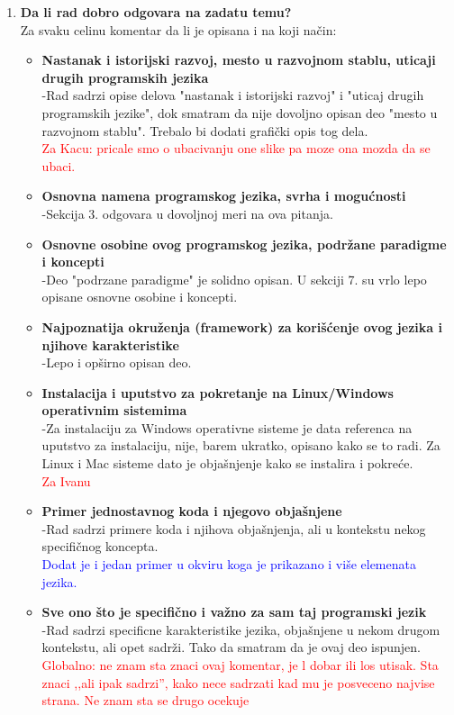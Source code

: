 \documentclass[a4paper]{report}
\newcommand{\odgovorAutora}[1]{\textcolor{blue}{#1}}
\newcommand{\note}[1]{\textcolor{red}{#1}}
\begin{document}
\begin{enumerate}
\item \textbf {Da li rad dobro odgovara na zadatu temu?}\\
  Za svaku celinu komentar da li je opisana i na koji na\v cin:
\begin{itemize}
   

    \item \textbf {Nastanak i istorijski razvoj, mesto u razvojnom stablu, uticaji drugih programskih jezika} \\
      -Rad sadrzi opise delova "nastanak i istorijski razvoj" i "uticaj drugih programskih jezike", dok smatram da nije dovoljno opisan deo "mesto u razvojnom stablu". Trebalo bi dodati grafi\v cki opis tog dela. \\
\note{Za Kacu: pricale smo o ubacivanju one slike pa moze ona mozda da se ubaci.}

    \item \textbf {Osnovna namena programskog jezika, svrha i mogućnosti}\\
      -Sekcija 3. odgovara u dovoljnoj meri na ova pitanja.
    \item \textbf {Osnovne osobine ovog programskog jezika, podržane paradigme i koncepti}\\
      -Deo "podrzane paradigme" je solidno opisan. U sekciji 7. su vrlo lepo opisane osnovne osobine i koncepti.
    \item \textbf {Najpoznatija okruženja (framework) za korišćenje ovog jezika i njihove karakteristike}\\
      -Lepo i op\v sirno opisan deo.
    \item \textbf {Instalacija i uputstvo za pokretanje na Linux/Windows operativnim sistemima} \\
       -Za instalaciju za Windows operativne sisteme je data referenca na uputstvo za instalaciju, nije, barem ukratko, opisano kako se to radi. Za Linux i Mac sisteme dato je obja\v snjenje kako se instalira i pokre\' ce. \\
\note{Za Ivanu}
    \item \textbf {Primer jednostavnog koda i njegovo objašnjene}\\
      -Rad sadrzi primere koda i njihova obja\v snjenja, ali u kontekstu nekog specifi\v cnog koncepta. \\
\odgovorAutora{Dodat je i jedan primer u okviru koga je prikazano i više elemenata jezika.}
    \item \textbf {Sve ono što je specifično i važno za sam taj programski jezik} \\
      -Rad sadrzi specificne karakteristike jezika, obja\v snjene u nekom drugom kontekstu, ali opet sadr\v zi. Tako da smatram da je ovaj deo ispunjen.
\note{Globalno: ne znam sta znaci ovaj komentar, je l dobar ili los utisak. Sta znaci ,,ali ipak sadrzi'', kako nece sadrzati kad mu je posveceno najvise strana. Ne znam sta se drugo ocekuje}
\end{itemize}


\end{enumerate}
\end{document}
